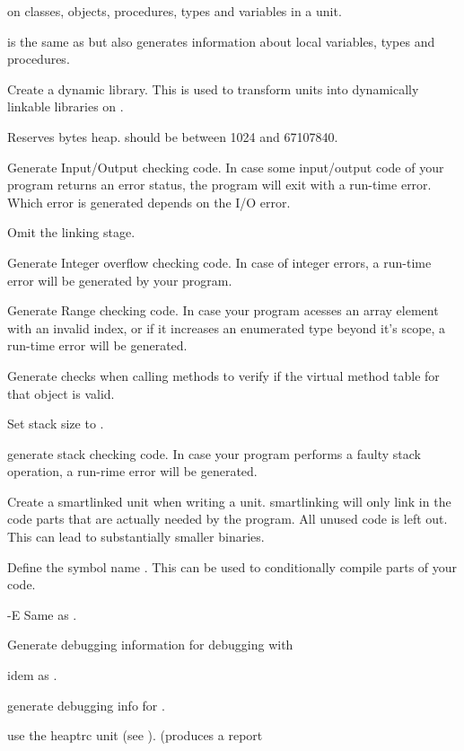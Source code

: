 \begin{description}
on classes, objects, procedures, types  and variables in a unit.
\item[-bl]  is the same as  but also generates
information about local variables, types and procedures.
\item [-CD] Create a dynamic library. This is used to transform units into
dynamically linkable libraries on \linux.
\item [-Chxxx]  Reserves  bytes heap.  should
be between 1024 and 67107840.
\item [-Ci]  Generate Input/Output checking code. In case some
input/output code of your program returns an error status, the program will
exit with a run-time error. Which error is generated depends on the I/O error.
\item [-Cn]  Omit the linking stage.
\item [-Co]  Generate Integer overflow checking code. In case of
integer errors, a run-time error will be generated by your program.
\item [-Cr]  Generate Range checking code. In case your program
acesses an array element with an invalid index, or if it increases an
enumerated type beyond it's scope, a run-time error will be generated.
\item [-CR]  Generate checks when calling methods to verify
if the virtual method table for that object is valid.
\item [-Csxxx]  Set stack size to .
\item [-Ct]  generate stack checking code. In case your program
performs a faulty stack operation, a run-rime error will be generated.
\item [-CX]  Create a smartlinked unit when writing a unit.
smartlinking will only link in the code parts that are actually needed by
the program. All unused code is left out. This can lead to substantially
smaller binaries.
\item [-dxxx]  Define the symbol name . This can be used
to conditionally compile parts of your code.
\item {-E}  Same as .
\item [-g]  Generate debugging information for debugging with
\item [-gg] idem as .
\item [-gd]  generate debugging info for .
\item [-gh] use the heaptrc unit (see \unitsref). (produces a report

\end{description}
